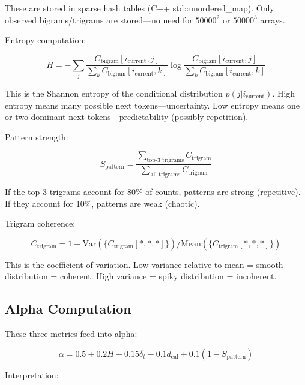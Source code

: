 \documentclass[11pt,a4paper]{article}
\begin{document}
These are stored in sparse hash tables (C++ std::unordered\_map). Only observed bigrams/trigrams are stored—no need for $50000^2$ or $50000^3$ arrays.

Entropy computation:

\begin{equation}
H = -\sum_{j} \frac{C_{\text{bigram}}[i_{\text{current}}, j]}{\sum_k C_{\text{bigram}}[i_{\text{current}}, k]} \log \frac{C_{\text{bigram}}[i_{\text{current}}, j]}{\sum_k C_{\text{bigram}}[i_{\text{current}}, k]}
\end{equation}

This is the Shannon entropy of the conditional distribution $p(j | i_{\text{current}})$. High entropy means many possible next tokens—uncertainty. Low entropy means one or two dominant next tokens—predictability (possibly repetition).

Pattern strength:

\begin{equation}
S_{\text{pattern}} = \frac{\sum_{\text{top-3 trigrams}} C_{\text{trigram}}}{\sum_{\text{all trigrams}} C_{\text{trigram}}}
\end{equation}

If the top 3 trigrams account for 80\% of counts, patterns are strong (repetitive). If they account for 10\%, patterns are weak (chaotic).

Trigram coherence:

\begin{equation}
C_{\text{trigram}} = 1 - \text{Var}\left( \{ C_{\text{trigram}}[*, *, *] \} \right) / \text{Mean}\left( \{ C_{\text{trigram}}[*, *, *] \} \right)
\end{equation}

This is the coefficient of variation. Low variance relative to mean = smooth distribution = coherent. High variance = spiky distribution = incoherent.

\subsection{Alpha Computation}

These three metrics feed into alpha:

\begin{equation}
\alpha = 0.5 + 0.2 H + 0.15 \delta_t - 0.1 d_{\text{cal}} + 0.1 (1 - S_{\text{pattern}})
\end{equation}

Interpretation:
\end{document}
